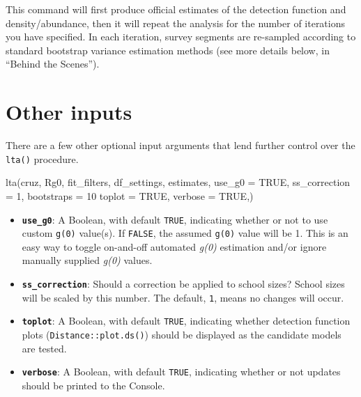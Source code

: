 \documentclass[
]{book}
\newenvironment{Shaded}{\begin{snugshade}}{\end{snugshade}}
\newcommand{\AttributeTok}[1]{\textcolor[rgb]{0.77,0.63,0.00}{#1}}
\newcommand{\ConstantTok}[1]{\textcolor[rgb]{0.00,0.00,0.00}{#1}}
\newcommand{\DecValTok}[1]{\textcolor[rgb]{0.00,0.00,0.81}{#1}}
\newcommand{\FunctionTok}[1]{\textcolor[rgb]{0.00,0.00,0.00}{#1}}
\newcommand{\NormalTok}[1]{#1}
\begin{document}
This command will first produce official estimates of the detection function and density/abundance, then it will repeat the analysis for the number of iterations you have specified. In each iteration, survey segments are re-sampled according to standard bootstrap variance estimation methods (see more details below, in ``Behind the Scenes'').

\hypertarget{other-inputs}{%
\section*{Other inputs}\label{other-inputs}}

There are a few other optional input arguments that lend further control over the \texttt{lta()} procedure.

\begin{Shaded}
\begin{Highlighting}[]
\FunctionTok{lta}\NormalTok{(cruz,}
\NormalTok{    Rg0,}
\NormalTok{    fit\_filters,}
\NormalTok{    df\_settings,}
\NormalTok{    estimates,}
    \AttributeTok{use\_g0 =} \ConstantTok{TRUE}\NormalTok{,}
    \AttributeTok{ss\_correction =} \DecValTok{1}\NormalTok{,}
    \AttributeTok{bootstraps =} \DecValTok{10}
    \AttributeTok{toplot =} \ConstantTok{TRUE}\NormalTok{,}
    \AttributeTok{verbose =} \ConstantTok{TRUE}\NormalTok{,)}
\end{Highlighting}
\end{Shaded}

\begin{itemize}
\item
  \textbf{\texttt{use\_g0}}: A Boolean, with default \texttt{TRUE}, indicating whether or not to use custom \texttt{g(0)} value(s). If \texttt{FALSE}, the assumed \texttt{g(0)} value will be 1. This is an easy way to toggle on-and-off automated \emph{g(0)} estimation and/or ignore manually supplied \emph{g(0)} values.
\item
  \textbf{\texttt{ss\_correction}}: Should a correction be applied to school sizes? School sizes will be scaled by this number. The default, \texttt{1}, means no changes will occur.
\item
  \textbf{\texttt{toplot}}: A Boolean, with default \texttt{TRUE}, indicating whether detection function plots (\texttt{Distance::plot.ds()}) should be displayed as the candidate models are tested.
\item
  \textbf{\texttt{verbose}}: A Boolean, with default \texttt{TRUE}, indicating whether or not updates should be printed to the Console.
\end{itemize}
\end{document}
